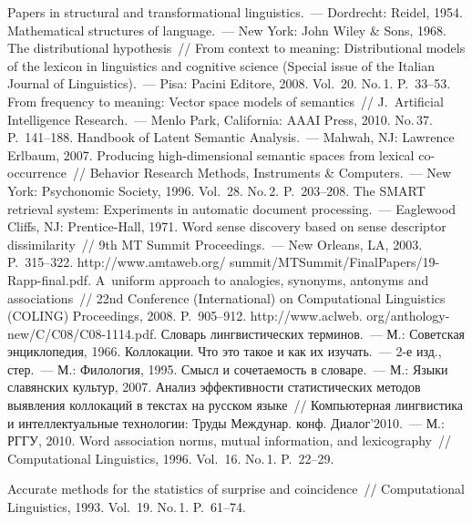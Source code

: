 \begin{multicols}{2}
{{\begin{thebibliography}{99}
 Papers in structural and transformational linguistics.~--- 
Dordrecht: Reidel, 1954.
 Mathematical structures of language.~--- New York: John 
Wiley \& Sons, 1968.
 The distributional hypothesis~// From context to meaning: 
Distributional models of the lexicon in linguistics and cognitive science (Special 
issue of the Italian Journal of Linguistics).~--- Pisa: Pacini Editore, 2008. 
Vol.~20. No.\,1. P.~33--53.
 From frequency to meaning: Vector space models 
of semantics~// J.~Artificial Intelligence Research.~--- Menlo Park, California: 
AAAI Press, 2010. No.\,37. P.~141--188.
 Handbook of 
Latent Semantic Analysis.~--- Mahwah, NJ: Lawrence Erlbaum, 2007.
 Producing high-dimensional semantic spaces from 
lexical co-occurrence~// Behavior Research Methods, Instruments \& 
Computers.~--- New York: Psychonomic Society, 1996. Vol.~28. No.\,2. 
P.~203--208.
 The SMART retrieval system: Experiments in automatic 
document processing.~--- Eaglewood Cliffs, NJ: Prentice-Hall, 1971.
 Word sense discovery based on sense descriptor dissimilarity~// 
9th MT Summit Proceedings.~--- New Orleans, LA, 2003. P.~315--322. {\sf 
http://www.amtaweb.org/ summit/MTSummit/FinalPapers/19-Rapp-final.pdf}.
 A~uniform approach to analogies, synonyms, antonyms and 
associations~// 22nd Conference (International) on Computational Linguistics 
(\mbox{COLING}) Proceedings, 2008. P.~905--912. {\sf 
http://www.aclweb. org/anthology-new/C/C08/C08-1114.pdf}.
 Словарь лингвистических терминов.~--- М.: 
Советская энциклопедия, 1966.
 Коллокации. Что это такое и как их изучать.~--- 2-е 
изд., стер.~--- М.: Филология, 1995.
 Смысл и сочетаемость в 
словаре.~--- М.: Языки славянских культур, 2007.
 Анализ эффективности статистических 
методов выявления коллокаций в текстах на русском языке~// 
Компьютерная лингвистика и интеллектуальные технологии: Труды 
Междунар. конф. Диалог'2010.~--- М.: РГГУ, 2010.
 Word association norms, mutual information, and 
lexicography~// Computational Linguistics,
1996. Vol.~16. No.\,1. P.~22--29.

\label{end\stat}

 Accurate methods for the statistics of surprise and 
coincidence~// Computational Linguistics,
1993. Vol.~19. No.\,1. P.~61--74.
\end{thebibliography}
}
}

\end{multicols}